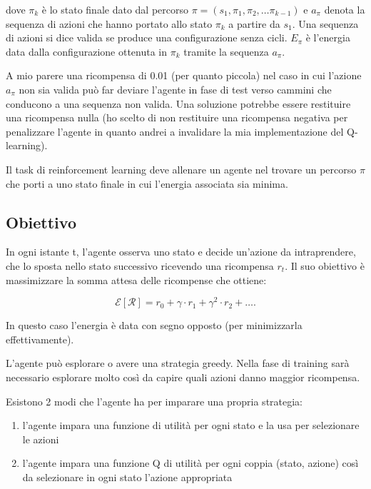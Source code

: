 \documentclass[conference]{IEEEtran}
\begin{document}
dove $\pi_k$ è lo stato finale dato dal percorso $\pi = (s_1, \pi_1, \pi_2, \dots \pi_{k-1})$ e $a_{\pi}$ denota la sequenza di azioni che hanno portato allo stato $\pi_k$ a partire da $s_1$. Una sequenza di azioni si dice valida se produce una configurazione senza cicli. $E_{\pi}$ è l'energia data dalla configurazione ottenuta in $\pi_k$ tramite la sequenza $a_{\pi}$.

A mio parere una ricompensa di 0.01 (per quanto piccola) nel caso in cui l'azione $a_{\pi}$ non sia valida può far deviare l'agente in fase di test verso cammini che conducono a una sequenza non valida. Una soluzione potrebbe essere restituire una ricompensa nulla (ho scelto di non restituire una ricompensa negativa per penalizzare l'agente in quanto andrei a invalidare la mia implementazione del Q-learning).

Il task di reinforcement learning deve allenare un agente nel trovare un percorso $\pi$ che porti a uno stato finale in cui l'energia associata sia minima.

\subsection{Obiettivo}

In ogni istante t, l'agente osserva uno stato e decide un'azione da intraprendere, che lo sposta nello stato successivo ricevendo una ricompensa $r_t$. Il suo obiettivo è massimizzare la somma attesa delle ricompense che ottiene:

\begin{equation}
\mathcal{E}[\mathcal{R}] = r_0 + \gamma \cdot r_1 + \gamma^2 \cdot r_2 + \dots.
\end{equation}

In questo caso l'energia è data con segno opposto (per minimizzarla effettivamente).

L'agente può esplorare o avere una strategia greedy. Nella fase di training sarà necessario esplorare molto così da capire quali azioni danno maggior ricompensa.

Esistono 2 modi che l'agente ha per imparare una propria strategia:

\begin{enumerate}
 \item l'agente impara una funzione di utilità per ogni stato e la usa per selezionare le azioni
 \item l'agente impara una funzione Q di utilità per ogni coppia (stato, azione) così da selezionare in ogni stato l'azione appropriata
\end{enumerate}
\end{document}
